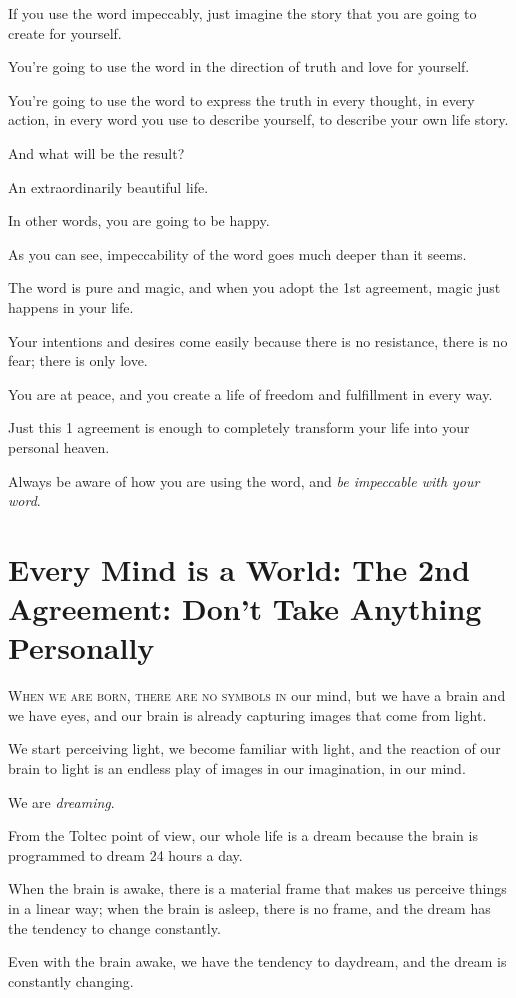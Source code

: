 \documentclass{article}
\numberwithin{equation}{section}
\begin{document}
If you use the word impeccably, just imagine the story that you are going to create for yourself.

You're going to use the word in the direction of truth and love for yourself.

You're going to use the word to express the truth in every thought, in every action, in every word you use to describe yourself, to describe your own life story.

And what will be the result?

An extraordinarily beautiful life.

In other words, you are going to be happy.

%
As you can see, impeccability of the word goes much deeper than it seems.

The word is pure and magic, and when you adopt the 1st agreement, magic just happens in your life.

Your intentions and desires come easily because there is no resistance, there is no fear; there is only love.

You are at peace, and you create a life of freedom and fulfillment in every way.

Just this 1 agreement is enough to completely transform your life into your personal heaven.

Always be aware of how you are using the word, and \textit{be impeccable with your word}.

\section{Every Mind is a World: The 2nd Agreement: Don't Take Anything Personally}
\textsc{When we are born, there are no symbols in} our mind, but we have a brain and we have eyes, and our brain is already capturing images that come from light.

We start perceiving light, we become familiar with light, and the reaction of our brain to light is an endless play of images in our imagination, in our mind.

We are \textit{dreaming}.

From the Toltec point of view, our whole life is a dream because the brain is programmed to dream 24 hours a day.

%
When the brain is awake, there is a material frame that makes us perceive things in a linear way; when the brain is asleep, there is no frame, and the dream has the tendency to change constantly.

Even with the brain awake, we have the tendency to daydream, and the dream is constantly changing.
\end{document}
